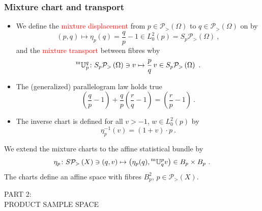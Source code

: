 \documentclass[xcolor=svgnames]{beamer}
\newcommand{\Bspaceat}[1]{L^2_0(#1)}
\newcommand{\expfibreat}[2]{S_{#1}#2}
\newcommand{\mtransport}[2]{\prescript{\text{m}}{} {\mathbb U} _ {#1} ^ {#2}}
\newcommand{\opensimplexon}[1]{\mathcal P_>\left(#1\right)}
\newcommand{\rosso}[1]{\textcolor{red}{#1}}
\renewcommand{\emph}{\rosso}
\begin{document}
\begin{frame}\small\frametitle{Mixture chart and transport}
\begin{itemize}
\item  We define the \emph{mixture displacement} from $p \in \opensimplexon \Omega$ to $q \in \opensimplexon \Omega$ on by
       \begin{equation*}
   (p,q) \mapsto \eta_p(q) = \frac q p - 1 \in \Bspaceat p = \expfibreat p {\opensimplexon \Omega} \ ,
    \end{equation*}
    and the \emph{mixture transport} between fibres wby
    \begin{equation*}
      \mtransport p q \colon \expfibreat p {\opensimplexon \Omega} \ni v \mapsto \frac p q \, v \in \expfibreat p {\opensimplexon \Omega} \ .
    \end{equation*}
\item The (generalized) parallelogram law holds true
  \begin{equation*}
 \left(\frac q p -1\right) + \frac q p \left(\frac r q -1\right) = \left(\frac r p -1\right) \ .
\end{equation*}
\item The inverse chart is defined for all $v > -1$, $w \in \Bspaceat p$ by
  \begin{equation*}
    \eta^{-1}_p(v) =  (1+v) \cdot p \ .
  \end{equation*}
\end{itemize} 

\begin{block}{} We extend the mixture charts to the affine statistical bundle by
    \begin{equation*}
\eta_p \colon S\opensimplexon X \ni (q,v) \mapsto \left(\eta_p(q), \mtransport q p v \right) \in B_p \times B_p \ .        
    \end{equation*}
    The charts define an affine space with fibres $B_p^2$, $p \in \opensimplexon X$.
\end{block}

\end{frame}

\begin{frame}

    \huge PART 2: \\
    PRODUCT SAMPLE SPACE
    
\end{frame}
\end{document}

